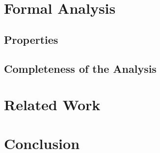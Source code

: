 \documentclass{llncs}
\begin{document}
\section{Formal Analysis}
\subsection{Properties}
\subsection{Completeness of the Analysis}

\section{Related Work}

\section{Conclusion}
\end{document}
